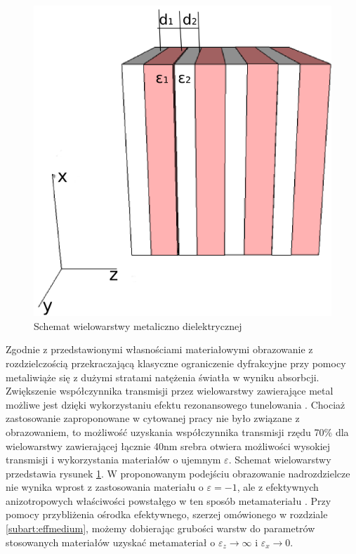 \begin{figure}[tbh]
	\includegraphics[width=.5\textwidth]{images/multilayer/multilayer-3d.png}
	\caption{Schemat wielowarstwy metaliczno dielektrycznej}
	\label{fig:mulschem}
\end{figure}


Zgodnie z przedstawionymi własnościami materiałowymi obrazowanie z rozdzielczością przekraczającą klasyczne ograniczenie dyfrakcyjne przy pomocy metaliwiąże się z dużymi stratami natężenia światła w wyniku absorbcji. Zwiększenie współczynnika transmisji przez wielowarstwy zawierające metal możliwe jest dzięki wykorzystaniu efektu rezonansowego tunelowania \cite{scalora-transparentmetal}. Chociaż zastosowanie zaproponowane w cytowanej pracy nie było związane z obrazowaniem, to możliwość uzyskania współczynnika transmisji rzędu 70\% dla wielowarstwy zawierającej łącznie 40nm srebra otwiera możliwości wysokiej transmisji i wykorzystania materiałów o ujemnym $\varepsilon$. Schemat wielowarstwy przedstawia rysunek \ref{fig:mulschem}. W proponowanym podejściu obrazowanie nadrozdzielcze nie wynika wprost z zastosowania materiału o $\varepsilon = -1$, ale z efektywnych anizotropowych właściwości powstałęgo w ten sposób  metamateriału \cite{ramakrishna2003imaging}. Przy pomocy przybliżenia ośrodka efektywnego, szerzej omówionego w rozdziale \ref{subart:effmedium}, możemy dobierając grubości warstw do parametrów stosowanych materiałów uzyskać metamateriał o $\varepsilon_z \to \infty$ i $\varepsilon_x \to 0$.


